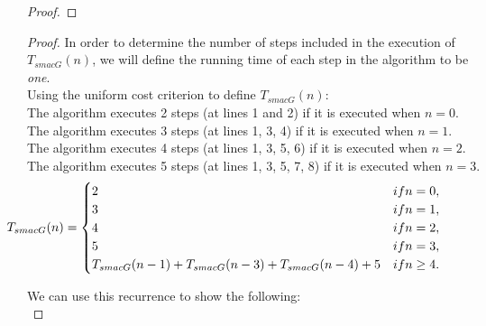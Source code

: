 \documentclass[12pt]{article}
\newenvironment{problem}[2][Problem]{\begin{trivlist}
\item[\hskip \labelsep {\bfseries #1}\hskip \labelsep {\bfseries #2.}]}{\end{trivlist}}
\begin{document}
\begin{problem}{3}
\end{problem}

\begin{proof}
\end{proof}



\begin{problem}{4}
\end{problem}

\begin{proof}
    In order to determine the number of steps included in the execution of $T_{smacG}(n)$, we will define the running time of each step in the algorithm to be \textit{one}.\\

    \noindent Using the uniform cost criterion to define $T_{smacG}(n)$: \\
    
    \noindent The algorithm executes 2 steps (at lines 1 and 2) if it is executed when $n = 0$. \\
    \noindent The algorithm executes 3 steps (at lines 1, 3, 4) if it is executed when $n = 1$. \\
    \noindent The algorithm executes 4 steps (at lines 1, 3, 5, 6) if it is executed when $n = 2$. \\
    \noindent The algorithm executes 5 steps (at lines 1, 3, 5, 7, 8) if it is executed when $n = 3$. \\
    
    
    \[ \hspace*{-17mm}T_{smacG}(n) = 
        \begin{cases} 
          2 & if n = 0, \\
          3 & if n = 1, \\
          4 & if n = 2, \\
          5 & if n = 3, \\
          T_{smacG}(n-1) + T_{smacG}(n-3) + T_{smacG}(n-4) + 5 & if n \geq 4.
       \end{cases}
    \]
    
    \noindent We can use this recurrence to show the following:\\
    

\end{proof}
\end{document}
